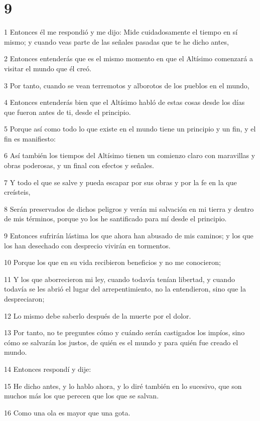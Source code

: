 \chapter{9}

\par 1 Entonces él me respondió y me dijo: Mide cuidadosamente el tiempo en sí mismo; y cuando veas parte de las señales pasadas que te he dicho antes,
\par 2 Entonces entenderás que es el mismo momento en que el Altísimo comenzará a visitar el mundo que él creó.
\par 3 Por tanto, cuando se vean terremotos y alborotos de los pueblos en el mundo,
\par 4 Entonces entenderás bien que el Altísimo habló de estas cosas desde los días que fueron antes de ti, desde el principio.
\par 5 Porque así como todo lo que existe en el mundo tiene un principio y un fin, y el fin es manifiesto:
\par 6 Así también los tiempos del Altísimo tienen un comienzo claro con maravillas y obras poderosas, y un final con efectos y señales.
\par 7 Y todo el que se salve y pueda escapar por sus obras y por la fe en la que creísteis,
\par 8 Serán preservados de dichos peligros y verán mi salvación en mi tierra y dentro de mis términos, porque yo los he santificado para mí desde el principio.
\par 9 Entonces sufrirán lástima los que ahora han abusado de mis caminos; y los que los han desechado con desprecio vivirán en tormentos.
\par 10 Porque los que en su vida recibieron beneficios y no me conocieron;
\par 11 Y los que aborrecieron mi ley, cuando todavía tenían libertad, y cuando todavía se les abrió el lugar del arrepentimiento, no la entendieron, sino que la despreciaron;
\par 12 Lo mismo debe saberlo después de la muerte por el dolor.
\par 13 Por tanto, no te preguntes cómo y cuándo serán castigados los impíos, sino cómo se salvarán los justos, de quién es el mundo y para quién fue creado el mundo.
\par 14 Entonces respondí y dije:
\par 15 He dicho antes, y lo hablo ahora, y lo diré también en lo sucesivo, que son muchos más los que perecen que los que se salvan.
\par 16 Como una ola es mayor que una gota.
